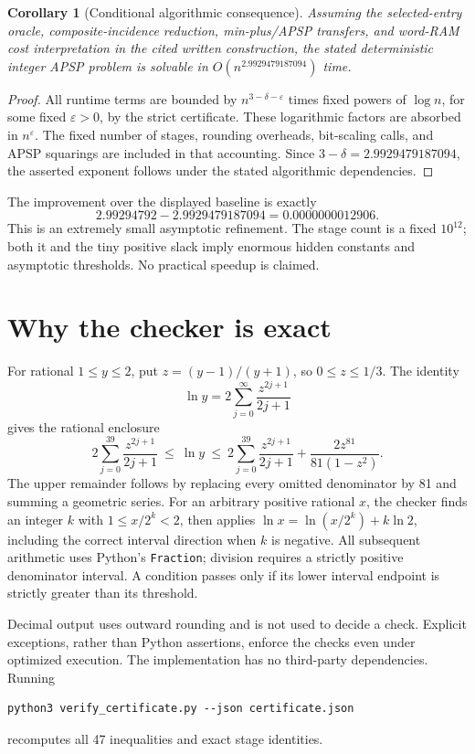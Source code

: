 \documentclass[11pt,a4paper]{article}
\newtheorem{corollary}[proposition]{Corollary}
\begin{document}
\begin{corollary}[Conditional algorithmic consequence]
Assuming the selected-entry oracle, composite-incidence reduction,
min-plus/APSP transfers, and word-RAM cost interpretation in the cited
written construction, the stated deterministic integer APSP problem is
solvable in $O(n^{2.9929479187094})$ time.
\end{corollary}
\begin{proof}
All runtime terms are bounded by $n^{3-\delta-\varepsilon}$ times fixed
powers of $\log n$, for some fixed $\varepsilon>0$, by the strict
certificate. These logarithmic factors are absorbed in $n^\varepsilon$.
The fixed number of stages, rounding overheads, bit-scaling calls, and
APSP squarings are included in that accounting. Since
$3-\delta=2.9929479187094$, the asserted exponent follows under the
stated algorithmic dependencies.
\end{proof}

The improvement over the displayed baseline is exactly
\[
 2.99294792-2.9929479187094=0.0000000012906.
\]
This is an extremely small asymptotic refinement. The stage count is
a fixed $10^{12}$; both it and the tiny positive slack imply enormous
hidden constants and asymptotic thresholds. No practical speedup is
claimed.

\section{Why the checker is exact}\label{sec:checker}
For rational $1\le y\le2$, put $z=(y-1)/(y+1)$, so $0\le z\le1/3$.
The identity
\[
 \ln y=2\sum_{j=0}^\infty\frac{z^{2j+1}}{2j+1}
\]
gives the rational enclosure
\[
 2\sum_{j=0}^{39}\frac{z^{2j+1}}{2j+1}
 \ \le\ \ln y\ \le\
 2\sum_{j=0}^{39}\frac{z^{2j+1}}{2j+1}
 +\frac{2z^{81}}{81(1-z^2)}.
\]
The upper remainder follows by replacing every omitted denominator by
81 and summing a geometric series. For an arbitrary positive rational
$x$, the checker finds an integer $k$ with $1\le x/2^k<2$, then applies
$\ln x=\ln(x/2^k)+k\ln2$, including the correct interval direction
when $k$ is negative. All subsequent arithmetic uses Python's
\texttt{Fraction}; division requires a strictly positive denominator
interval. A condition passes only if its lower interval endpoint is
strictly greater than its threshold.

Decimal output uses outward rounding and is not used to decide a check.
Explicit exceptions, rather than Python assertions, enforce the checks
even under optimized execution. The implementation has no third-party
dependencies. Running
\begin{verbatim}
python3 verify_certificate.py --json certificate.json
\end{verbatim}
recomputes all 47 inequalities and exact stage identities.
\end{document}
